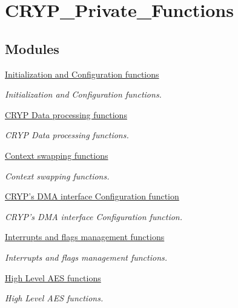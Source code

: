\hypertarget{group___c_r_y_p___private___functions}{\section{C\-R\-Y\-P\-\_\-\-Private\-\_\-\-Functions}
\label{group___c_r_y_p___private___functions}
}
\subsection*{Modules}
\begin{DoxyCompactItemize}
\item 
\hyperlink{group___c_r_y_p___group1}{Initialization and Configuration functions}
\begin{DoxyCompactList}\small\item\em Initialization and Configuration functions. \end{DoxyCompactList}\item 
\hyperlink{group___c_r_y_p___group2}{C\-R\-Y\-P Data processing functions}
\begin{DoxyCompactList}\small\item\em C\-R\-Y\-P Data processing functions. \end{DoxyCompactList}\item 
\hyperlink{group___c_r_y_p___group3}{Context swapping functions}
\begin{DoxyCompactList}\small\item\em Context swapping functions. \end{DoxyCompactList}\item 
\hyperlink{group___c_r_y_p___group4}{C\-R\-Y\-P's D\-M\-A interface Configuration function}
\begin{DoxyCompactList}\small\item\em C\-R\-Y\-P's D\-M\-A interface Configuration function. \end{DoxyCompactList}\item 
\hyperlink{group___c_r_y_p___group5}{Interrupts and flags management functions}
\begin{DoxyCompactList}\small\item\em Interrupts and flags management functions. \end{DoxyCompactList}\item 
\hyperlink{group___c_r_y_p___group6}{High Level A\-E\-S functions}
\begin{DoxyCompactList}\small\item\em High Level A\-E\-S functions. \end{DoxyCompactList}\item 

\end{DoxyCompactItemize}
